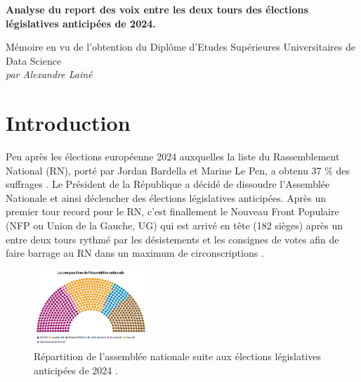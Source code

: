 \documentclass[11pt]{article}
\begin{document}
    

    \pagestyle{fancy}
    \fancyfoot{}
    \vspace{5cm}

    \begin{center}
        \Large \textbf{Analyse du report des voix entre les deux tours des élections législatives anticipées de 2024.}
    \end{center}
    
    \vspace{2cm}
    
    \begin{center}
        Mémoire en vu de l'obtention du Diplôme d'Etudes Supérieures Universitaires de Data Science \\
        \textit{par Alexandre Lainé}
    \end{center}

    \newpage
    \pagestyle{fancy}
    \fancyhead{} %
    \fancyfoot{} %
    \fancyfoot[R]{\thepage}

    \section{Introduction}

    Peu après les élections européenne 2024 auxquelles la liste du Rassemblement National (RN), porté par Jordan Bardella et Marine Le Pen, a obtenu 37 \% des suffrages \cite{Le_Monde_2024a}. Le Président de la République a décidé de dissoudre l'Assemblée Nationale et ainsi déclencher des élections législatives anticipées. Après un premier tour record pour le RN, c'est finallement le Nouveau Front Populaire (NFP ou Union de la Gauche, UG) qui est arrivé en tête (182 sièges) après un entre deux tours rythmé par les désistements et les consignes de votes afin de faire barrage au RN dans un maximum de circonscriptions \cite{Wikipédia_2024a}. 

    \begin{figure}
        \begin{center}
            \includegraphics[width=0.38\textwidth]{Resultats_2024.png}    
        \end{center}
        \caption{Répartition de l'assemblée nationale suite aux élections législatives anticipées de 2024 \cite{Le_Monde_2024b}.}
    \end{figure}
\end{document}
